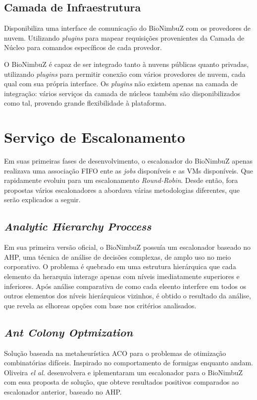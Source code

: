 \begin{itemize}
	\end{itemize}
	
	\subsection{Camada de Infraestrutura} Disponibiliza uma interface de comunicação do BioNimbuZ com os provedores de nuvem. Utilizando \textit{plugins} para mapear requisições provenientes da Camada de Núcleo para comandos específicos de cada provedor.

O BioNimbuZ é capaz de ser integrado tanto à nuvens públicas quanto privadas, utilizando \textit{plugins} para permitir conexão com vários provedores de nuvem, cada qual com sua própria interface. Os \textit{plugins} não existem apenas na camada de integração: vários serviços da camada de núcleos também são disponibilizados como tal, provendo grande flexibilidade à plataforma.


\section{Serviço de Escalonamento}

Em suas primeiras fases de desenvolvimento, o escalonador do BioNimbuZ apenas realizava uma associação \acrfull{FIFO} ente as \textit{jobs} disponíveis e as \acrshort{VM}s disponíveis. Que rapidamente evoluiu para um escalonamento \textit{Round-Robin}. Desde então, fora propostas vários escalonadores a abordava várias metodologias diferentes, que serão explicados a seguir.

\subsection{\textit{Analytic Hierarchy Proccess}}
Em sua primeira versão oficial, o BioNimbuZ possuía um escalonador baseado no \acrfull{AHP}\cite{6732620_BioNimbuZ_ACOsched}, uma técnica de análise de decisões complexas, de amplo uso no meio corporativo. O problema é quebrado em uma estrutura hierárquica que cada elemento da herarquia interage apenas com níveis imediatamente superiores e inferiores. Após análise comparativa de como cada eleento interfere em todos os outros elementos dos níveis hierárquicos vizinhos, é obtido o resultado da análise, que revela as elhoreas opções com base nos critérios analisados.

\subsection{\textit{Ant Colony Optmization}}
Solução baseada na metaheurística \acrfull{ACO}\cite{ACO_DORIGO2005243} para o problemas de otimização combinatórias difíceis. Inspirado no comportamento de formigas enquanto andam. Oliveira \textit{el al.}\cite{6732620_BioNimbuZ_ACOsched} desenvolvera e iplementaram um escalonador para o BioNimbuZ com essa proposta de solução, que obteve resultados positivos comparados ao escalonador anterior, baseado no \acrshort{AHP}.

